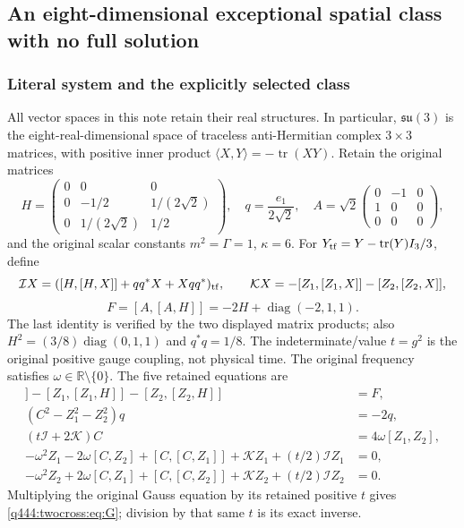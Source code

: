 \subsection{An eight-dimensional exceptional spatial class with no full solution}
\label{q444:twocross:section}

\subsubsection{Literal system and the explicitly selected class}
\label{q444:twocross:literal-system}

All vector spaces in this note retain their real structures. In particular,
$\mathfrak{su}(3)$ is the eight-real-dimensional space of traceless anti-Hermitian
complex $3\times3$ matrices, with positive inner product
$\langle X,Y\rangle=-\operatorname{tr}(XY)$. Retain the original matrices
\[
H=\begin{pmatrix}0&0&0\\0&-1/2&1/(2\sqrt2)\\
0&1/(2\sqrt2)&1/2\end{pmatrix},\quad
q=\frac{e_1}{2\sqrt2},\quad
A=\sqrt2\begin{pmatrix}0&-1&0\\1&0&0\\0&0&0\end{pmatrix},
\]
and the original scalar constants $m^2=\Gamma=1$, $\kappa=6$.
For $Y_{\rm tf}=Y-\operatorname{tr}(Y)I_3/3$, define
\[
\mathcal IX=([H,[H,X]]+qq^*X+Xqq^*)_{\rm tf},\qquad
\mathcal KX=-[Z_1,[Z_1,X]]-[Z_2,[Z_2,X]],
\]
\[
F=[A,[A,H]]=-2H+\operatorname{diag}(-2,1,1).
\]
The last identity is verified by the two displayed matrix products; also
$H^2=(3/8)\operatorname{diag}(0,1,1)$ and $q^*q=1/8$.
The indeterminate/value $t=g^2$ is the original positive gauge coupling,
not physical time. The original frequency satisfies $\omega\in\mathbb R
\setminus\{0\}$. The five retained equations are
\begin{align}
[C,[C,H]]-[Z_1,[Z_1,H]]-[Z_2,[Z_2,H]]&=F,\label{q444:twocross:eq:H}\\
(C^2-Z_1^2-Z_2^2)q&=-2q,\label{q444:twocross:eq:q}\\
(t\mathcal I+2\mathcal K)C&=4\omega[Z_1,Z_2],\label{q444:twocross:eq:G}\\
-\omega^2Z_1-2\omega[C,Z_2]+[C,[C,Z_1]]
+\mathcal KZ_1+(t/2)\mathcal IZ_1&=0,\label{q444:twocross:eq:S1}\\
-\omega^2Z_2+2\omega[C,Z_1]+[C,[C,Z_2]]
+\mathcal KZ_2+(t/2)\mathcal IZ_2&=0.\label{q444:twocross:eq:S2}
\end{align}
Multiplying the original Gauss equation by its retained positive $t$
gives \eqref{q444:twocross:eq:G}; division by that same $t$ is its exact inverse.

